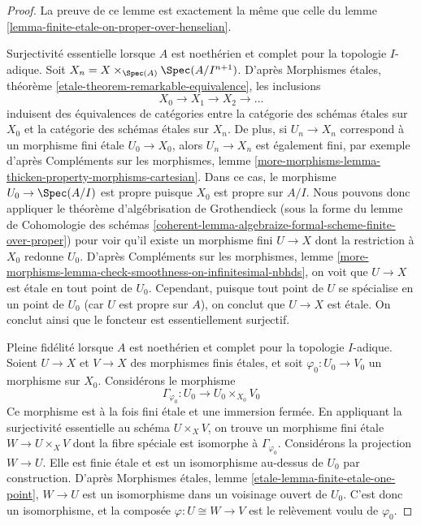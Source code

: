 \begin{proof}
La preuve de ce lemme est exactement la même que celle du
lemme \ref{lemma-finite-etale-on-proper-over-henselian}.

\medskip\noindent
Surjectivité essentielle lorsque $A$ est noethérien et complet pour la topologie $I$-adique.
Soit $X_n = X \times_{\Spec(A)} \Spec(A/I^{n + 1})$.
D'après Morphismes étales, théorème \ref{etale-theorem-remarkable-equivalence},
les inclusions
$$
X_0 \to X_1 \to X_2 \to \ldots
$$
induisent des équivalences de catégories entre la catégorie
des schémas étales sur $X_0$ et la catégorie des schémas
étales sur $X_n$.
De plus, si $U_n \to X_n$ correspond à un morphisme fini étale
$U_0 \to X_0$, alors $U_n \to X_n$ est également fini, par exemple
d'après Compléments sur les morphismes, lemme
\ref{more-morphisms-lemma-thicken-property-morphisms-cartesian}.
Dans ce cas, le morphisme $U_0 \to \Spec(A/I)$
est propre puisque $X_0$ est propre sur $A/I$. Nous pouvons donc appliquer
le théorème d'algébrisation de Grothendieck
(sous la forme du
lemme de Cohomologie des schémas
\ref{coherent-lemma-algebraize-formal-scheme-finite-over-proper})
pour voir qu'il existe un morphisme fini $U \to X$ dont la restriction
à $X_0$ redonne $U_0$. D'après Compléments sur les morphismes, lemme
\ref{more-morphisms-lemma-check-smoothness-on-infinitesimal-nbhds},
on voit que $U \to X$ est étale en tout point de $U_0$.
Cependant, puisque tout point de $U$ se spécialise en un point de $U_0$
(car $U$ est propre sur $A$), on conclut que $U \to X$ est étale.
On conclut ainsi que le foncteur est essentiellement surjectif.

\medskip\noindent
Pleine fidélité lorsque $A$ est noethérien et complet pour la topologie $I$-adique.
Soient $U \to X$ et $V \to X$ des morphismes finis étales, et
soit $\varphi_0 : U_0 \to V_0$ un morphisme sur $X_0$. Considérons
le morphisme
$$
\Gamma_{\varphi_0} : U_0 \longrightarrow U_0 \times_{X_0} V_0
$$
Ce morphisme est à la fois fini étale et une immersion fermée.
En appliquant la surjectivité essentielle au schéma $U \times_X V$, on trouve
un morphisme fini étale $W \to U \times_X V$ dont la fibre spéciale
est isomorphe à $\Gamma_{\varphi_0}$. Considérons la projection
$W \to U$. Elle est finie étale et est un isomorphisme au-dessus de $U_0$ par
construction. D'après Morphismes étales, lemme
\ref{etale-lemma-finite-etale-one-point},
$W \to U$ est un isomorphisme dans un voisinage ouvert de $U_0$.
C'est donc un isomorphisme, et la composée $\varphi : U \cong W \to V$
est le relèvement voulu de $\varphi_0$.


\end{proof}
